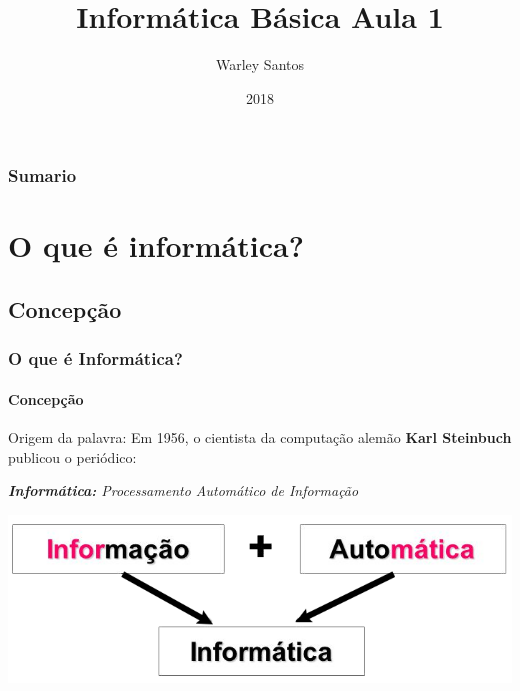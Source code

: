\documentclass[12pt,a4paper,final]{beamer}
\author{Warley Santos}
\title{Informática Básica Aula 1}
\institute{Associação Gesto de Amor}
\date{2018}
\begin{document}
	\begin{frame}
		\titlepage
	\end{frame}
	\begin{frame}
	    \frametitle{Sumario}
		\tableofcontents
	\end{frame}
    \section{O que é informática?}
        \subsection{Concepção}
            \begin{frame}
                \frametitle{O que é Informática?}
                \framesubtitle{Concepção}
                \begin{block}{Origem da palavra:}
                    Em 1956, o cientista da computação alemão \textbf{Karl Steinbuch} publicou o periódico:
                 \end{block}
                 \begin{block}{}
                    \emph{\textbf{Informática:} Processamento Automático de Informação}
                \end{block}
                \begin{block}{}
                     \centering
                     \includegraphics[scale=0.3]{Imagens/informatica.png}
                \end{block}
            \end{frame}
\end{document}
